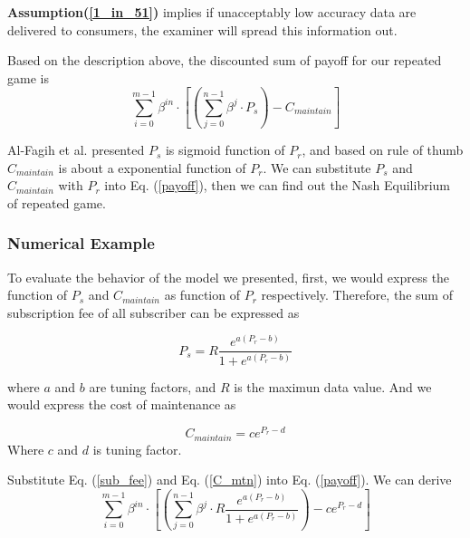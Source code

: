 \documentclass[journal,10pt,a4paper]{IEEEtran}
\begin{document}
\textbf{Assumption(\ref{1_in_51})}  implies if unacceptably low accuracy data are delivered to consumers, the examiner will spread this information out.


Based on the description above, the discounted sum of payoff for our repeated game is
\begin{equation} \label{payoff}
    \sum_{i=0}^{m - 1}{\beta^{in}\cdot [(\sum_{j=0}^{n - 1} \beta^j \cdot P_s) - C_{maintain}]}
\end{equation}

Al-Fagih et al. presented\cite{DataPrice} $P_s$ is sigmoid function of $P_r$, and based on rule of thumb $C_{maintain}$ is about a exponential function of $P_r$. We can substitute $P_s$ and $C_{maintain}$ with $P_r$ into Eq. (\ref{payoff}), then we can find out the Nash Equilibrium of repeated game.

\subsubsection{Numerical Example}
To evaluate the behavior of the model we presented, first, we would express the function of $P_s$ and $C_{maintain}$ as function of $P_r$ respectively. Therefore, the sum of subscription fee of all subscriber can be expressed as

\begin{equation} \label{sub_fee}
P_s = R \frac{e^{a (P_r - b)}}{1 + e^{a (P_r - b)}}
\end{equation}

where $a$ and $b$ are tuning factors, and $R$ is the maximun data value.
And we would express the cost of maintenance as

\begin{equation} \label{C_mtn}
C_{maintain} = ce^{P_r - d}
\end{equation}
Where $c$ and $d$ is tuning factor.

Substitute Eq. (\ref{sub_fee}) and Eq. (\ref{C_mtn}) into Eq. (\ref{payoff}). We can derive
\begin{equation} \label{payoff_Pr}
\sum_{i=0}^{m - 1}{\beta^{in}\cdot [(\sum_{j=0}^{n - 1} \beta^j \cdot R \frac{e^{a (P_r - b)}}{1 + e^{a (P_r - b)}}) - ce^{P_r - d}]}
\end{equation}
\end{document}

